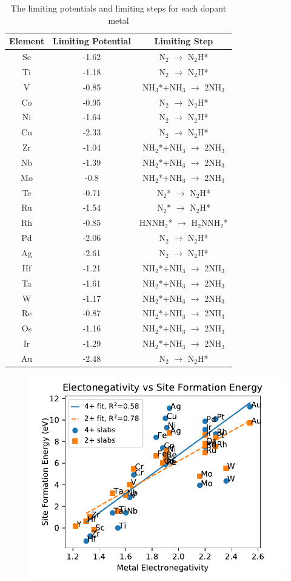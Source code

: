 \begin{table}
\begin{center}
\begin{tabular}{| c | c |c |}
\hline
Element & Limiting Potential & Limiting Step \\
\hline
Sc & -1.62 & N$_2$ $\rightarrow$ N$_2$H*\\
Ti & -1.18 & N$_2$ $\rightarrow$ N$_2$H*\\
V & -0.85 & NH$_3$*+NH$_3$ $\rightarrow$ 2NH$_3$\\
Co & -0.95 & N$_2$ $\rightarrow$ N$_2$H*\\
Ni & -1.64 & N$_2$ $\rightarrow$ N$_2$H*\\
Cu & -2.33 & N$_2$ $\rightarrow$ N$_2$H*\\
Zr & -1.04 & NH$_2$*+NH$_3$ $\rightarrow$ 2NH$_3$\\
Nb & -1.39 & NH$_2$*+NH$_3$ $\rightarrow$ 2NH$_3$\\
Mo & -0.8 & NH$_2$*+NH$_3$ $\rightarrow$ 2NH$_3$\\
Tc & -0.71 & N$_2$* $\rightarrow$ N$_2$H*\\
Ru & -1.54 & N$_2$* $\rightarrow$ N$_2$H*\\
Rh & -0.85 & HNNH$_2$* $\rightarrow$ H$_2$NNH$_2$*\\
Pd & -2.06 & N$_2$ $\rightarrow$ N$_2$H*\\
Ag & -2.61 & N$_2$ $\rightarrow$ N$_2$H*\\
Hf & -1.21 & NH$_2$*+NH$_3$ $\rightarrow$ 2NH$_3$\\
Ta & -1.61 & NH$_2$*+NH$_3$ $\rightarrow$ 2NH$_3$\\
W & -1.17 & NH$_2$*+NH$_3$ $\rightarrow$ 2NH$_3$\\
Re & -0.87 & NH$_2$*+NH$_3$ $\rightarrow$ 2NH$_3$\\
Os & -1.16 & NH$_2$*+NH$_3$ $\rightarrow$ 2NH$_3$\\
Ir & -1.29 & NH$_2$*+NH$_3$ $\rightarrow$ 2NH$_3$\\
Au & -2.48 & N$_2$ $\rightarrow$ N$_2$H*\\
\hline
\end{tabular}
\end{center}
\caption{The limiting potentials and limiting steps for each dopant metal}\label{table:limiting_steps}\end{table}\begin{figure}
\centering
\includegraphics[width=0.8\linewidth]{Images/electronegativity_vs_formation.pdf}

\end{figure}
